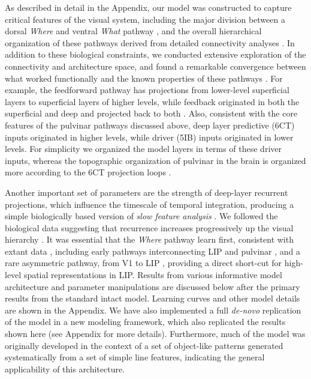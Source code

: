 \documentclass[11pt,twoside]{article}
\newif\myifpdf
\begin{document}
As described in detail in the Appendix, our model was constructed to capture critical features of the visual system, including the major division between a dorsal \emph{Where} and ventral \emph{What} pathway \citep{UngerleiderMishkin82}, and the overall hierarchical organization of these pathways derived from detailed connectivity analyses \citep{RocklandPandya79,FellemanVanEssen91,MarkovVezoliChameauEtAl14,MarkovErcsey-RavaszGomesEtAl14}.  In addition to these biological constraints, we conducted extensive exploration of the connectivity and architecture space, and found a remarkable convergence between what worked functionally and the known properties of these pathways \citep{OReillyWyatteRohrlich17}.  For example, the feedforward pathway has projections from lower-level superficial layers to superficial layers of higher levels, while feedback originated in both the superficial and deep and projected back to both \citep{RocklandPandya79,FellemanVanEssen91}.  Also, consistent with the core features of the pulvinar pathways discussed above, deep layer predictive (6CT) inputs originated in higher levels, while driver (5IB) inputs originated in lower levels.  For simplicity we organized the model layers in terms of these driver inputs, whereas the topographic organization of pulvinar in the brain is organized more according to the 6CT projection loops \citep{Shipp03}.

Another important set of parameters are the strength of deep-layer recurrent projections, which influence the timescale of temporal integration, producing a simple biologically based version of \emph{slow feature analysis} \citep{WiskottSejnowski02,Foldiak91}. We followed the biological data suggesting that recurrence increases progressively up the visual hierarchy \citep{ChaudhuriKnoblauchGarielEtAl15}.  It was essential that the \emph{Where} pathway learn first, consistent with extant data \citep{BourneRosa06,KiorpesPriceHall-HaroEtAl12}, including early pathways interconnecting LIP and pulvinar \citep{BridgeLeopoldBourne16}, and a rare asymmetric pathway, from V1 to LIP \citep{MarkovErcsey-RavaszGomesEtAl14}, providing a direct short-cut for high-level spatial representations in LIP.  Results from various informative model architecture and parameter manipulations are discussed below after the primary results from the standard intact model.  Learning curves and other model details are shown in the Appendix.  We have also implemented a full {\em de-novo} replication of the model in a new modeling framework, which also replicated the results shown here (see Appendix for more details).  Furthermore, much of the model was originally developed in the context of a set of object-like patterns generated systematically from a set of simple line features, indicating the general applicability of this architecture.
\end{document}

